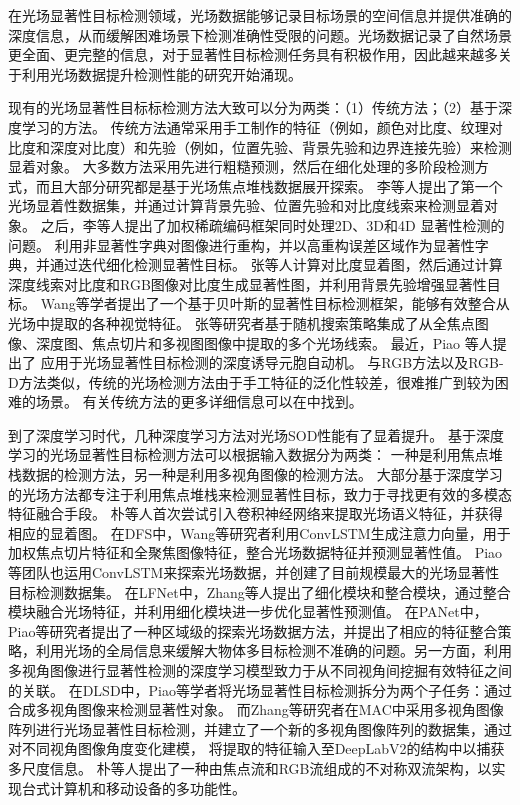在光场显著性目标检测领域，光场数据能够记录目标场景的空间信息并提供准确的深度信息，从而缓解困难场景下检测准确性受限的问题。光场数据记录了自然场景更全面、更完整的信息，对于显著性目标检测任务具有积极作用，因此越来越多关于利用光场数据提升检测性能的研究开始涌现。


现有的光场显著性目标标检测方法大致可以分为两类：（1）传统方法；（2）基于深度学习的方法。 传统方法通常采用手工制作的特征（例如，颜色对比度、纹理对比度和深度对比度）和先验（例如，位置先验、背景先验和边界连接先验）来检测显着对象。 
大多数方法采用先进行粗糙预测，然后在细化处理的多阶段检测方式，而且大部分研究都是基于光场焦点堆栈数据展开探索。
%
%
李等人提出了第一个光场显着性数据集，并通过计算背景先验、位置先验和对比度线索来检测显着对象。
之后，李等人提出了加权稀疏编码框架同时处理2D、3D和4D 显著性检测的问题。
利用非显著性字典对图像进行重构，并以高重构误差区域作为显著性字典，并通过迭代细化检测显著性目标。
张等人计算对比度显着图，然后通过计算深度线索对比度和RGB图像对比度生成显著性图，并利用背景先验增强显著性目标。
Wang等学者提出了一个基于贝叶斯的显著性目标检测框架，能够有效整合从光场中提取的各种视觉特征。
张等研究者基于随机搜索策略集成了从全焦点图像、深度图、焦点切片和多视图图像中提取的多个光场线索。 
最近，Piao 等人提出了
应用于光场显著性目标检测的深度诱导元胞自动机。
与RGB方法以及RGB-D方法类似，传统的光场检测方法由于手工特征的泛化性较差，很难推广到较为困难的场景。
有关传统方法的更多详细信息可以在中找到。



到了深度学习时代，几种深度学习方法对光场SOD性能有了显着提升。 
基于深度学习的光场显著性目标检测方法可以根据输入数据分为两类：
一种是利用焦点堆栈数据的检测方法，另一种是利用多视角图像的检测方法。
大部分基于深度学习的光场方法都专注于利用焦点堆栈来检测显著性目标，致力于寻找更有效的多模态特征融合手段。
朴等人首次尝试引入卷积神经网络来提取光场语义特征，并获得相应的显着图。 
在DFS中，Wang等研究者利用ConvLSTM生成注意力向量，用于加权焦点切片特征和全聚焦图像特征，整合光场数据特征并预测显著性值。
Piao等团队也运用ConvLSTM来探索光场数据，并创建了目前规模最大的光场显著性目标检测数据集。
在LFNet中，Zhang等人提出了细化模块和整合模块，通过整合模块融合光场特征，并利用细化模块进一步优化显著性预测值。
在PANet中，Piao等研究者提出了一种区域级的探索光场数据方法，并提出了相应的特征整合策略，利用光场的全局信息来缓解大物体多目标检测不准确的问题。另一方面，利用多视角图像进行显著性检测的深度学习模型致力于从不同视角间挖掘有效特征之间的关联。
在DLSD中，Piao等学者将光场显著性目标检测拆分为两个子任务：通过合成多视角图像来检测显著性对象。
而Zhang等研究者在MAC中采用多视角图像阵列进行光场显著性目标检测，并建立了一个新的多视角图像阵列的数据集，通过对不同视角图像角度变化建模，
将提取的特征输入至DeepLabV2的结构中以捕获多尺度信息。
朴等人提出了一种由焦点流和RGB流组成的不对称双流架构，以实现台式计算机和移动设备的多功能性。



